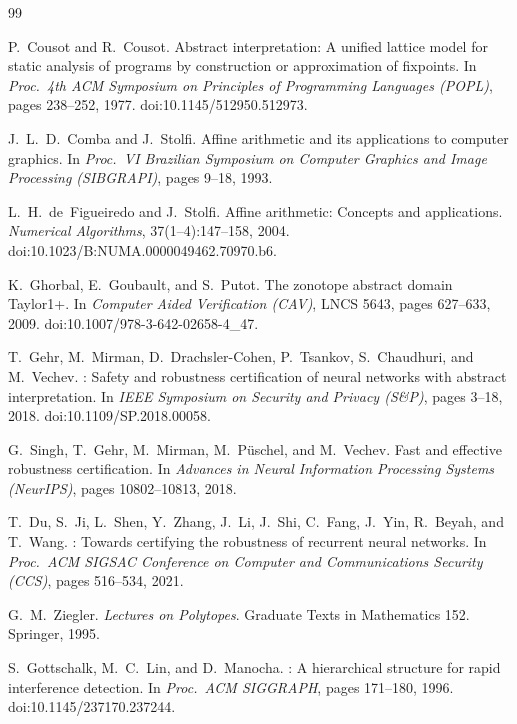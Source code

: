 \documentclass[11pt]{article}
\theoremstyle{definition}
\theoremstyle{remark}
\begin{document}
\begin{thebibliography}{99}

P.~Cousot and R.~Cousot.
\newblock Abstract interpretation: A unified lattice model for static analysis of programs by construction or approximation of fixpoints.
\newblock In \emph{Proc.\ 4th ACM Symposium on Principles of Programming Languages (POPL)}, pages 238--252, 1977. doi:10.1145/512950.512973.

J.~L.~D.~Comba and J.~Stolfi.
\newblock Affine arithmetic and its applications to computer graphics.
\newblock In \emph{Proc.\ VI Brazilian Symposium on Computer Graphics and Image Processing (SIBGRAPI)}, pages 9--18, 1993.

L.~H.~de~Figueiredo and J.~Stolfi.
\newblock Affine arithmetic: Concepts and applications.
\newblock \emph{Numerical Algorithms}, 37(1--4):147--158, 2004. doi:10.1023/B:NUMA.0000049462.70970.b6.

K.~Ghorbal, E.~Goubault, and S.~Putot.
\newblock The zonotope abstract domain {Taylor1+}.
\newblock In \emph{Computer Aided Verification (CAV)}, LNCS 5643, pages 627--633, 2009. doi:10.1007/978-3-642-02658-4\_47.

T.~Gehr, M.~Mirman, D.~Drachsler-Cohen, P.~Tsankov, S.~Chaudhuri, and M.~Vechev.
: Safety and robustness certification of neural networks with abstract interpretation.
\newblock In \emph{IEEE Symposium on Security and Privacy (S\&P)}, pages 3--18, 2018. doi:10.1109/SP.2018.00058.

G.~Singh, T.~Gehr, M.~Mirman, M.~P\"uschel, and M.~Vechev.
\newblock Fast and effective robustness certification.
\newblock In \emph{Advances in Neural Information Processing Systems (NeurIPS)}, pages 10802--10813, 2018.

T.~Du, S.~Ji, L.~Shen, Y.~Zhang, J.~Li, J.~Shi, C.~Fang, J.~Yin, R.~Beyah, and T.~Wang.
: Towards certifying the robustness of recurrent neural networks.
\newblock In \emph{Proc.\ ACM SIGSAC Conference on Computer and Communications Security (CCS)}, pages 516--534, 2021.

G.~M.~Ziegler.
\newblock \emph{Lectures on Polytopes}.
\newblock Graduate Texts in Mathematics 152. Springer, 1995.

S.~Gottschalk, M.~C.~Lin, and D.~Manocha.
: A hierarchical structure for rapid interference detection.
\newblock In \emph{Proc.\ ACM SIGGRAPH}, pages 171--180, 1996. doi:10.1145/237170.237244.


\end{thebibliography}
\end{document}
